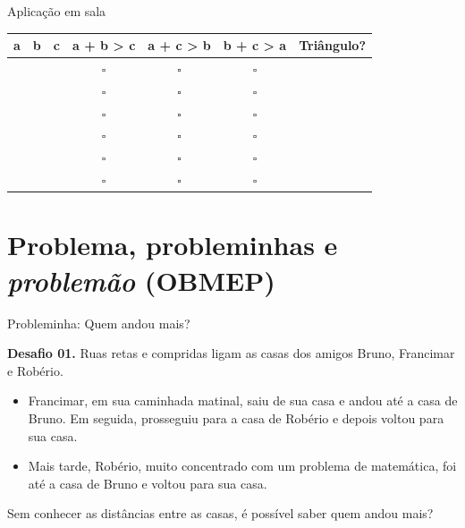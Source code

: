\documentclass[12pt]{beamer}
\begin{document}
    \begin{frame}{Aplicação em sala}
        \begin{table}[h]
        \centering
        \small
        \setlength{\tabcolsep}{8pt}
        \renewcommand{\arraystretch}{1.5}

            \begin{tabular}{|c|c|c||c|c|c||c|}
                \hline
                \textbf{a} & \textbf{b} & \textbf{c} & \textbf{a + b > c} & \textbf{a + c > b} & \textbf{b + c > a} & \textbf{Triângulo?} \\
                \hline
                & & & $\square$ & $\square$ & $\square$ & \\
                \hline
                & & & $\square$ & $\square$ & $\square$ & \\
                \hline
                & & & $\square$ & $\square$ & $\square$ & \\
                \hline
                & & & $\square$ & $\square$ & $\square$ & \\
                \hline
                & & & $\square$ & $\square$ & $\square$ & \\
                \hline
                & & & $\square$ & $\square$ & $\square$ & \\
                \hline
            \end{tabular}
        \end{table}
    \end{frame}

\section{Problema, probleminhas e \textit{problemão} (OBMEP)}




\begin{frame}{Probleminha: Quem andou mais?}

    \begin{exampleblock}{\textbf{Desafio 01.}}
        Ruas retas e compridas ligam as casas dos amigos Bruno, Francimar e Robério.

    \begin{itemize}\justifying
        \item Francimar, em sua caminhada matinal, saiu de sua casa e andou até a casa de Bruno. Em seguida, prosseguiu para a casa de Robério e depois voltou para sua casa.
        \item Mais tarde, Robério, muito concentrado com um problema de matemática, foi até a casa de Bruno e voltou para sua casa.
    \end{itemize} Sem conhecer as distâncias entre as casas, é possível saber quem andou mais?
    
    \end{exampleblock}

\end{frame}
\end{document}
